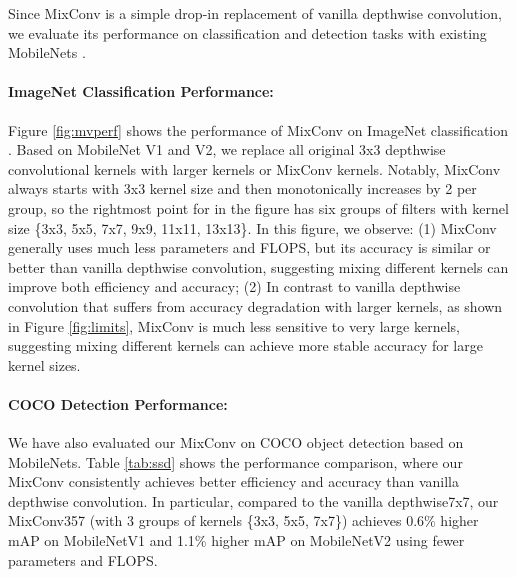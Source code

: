 \documentclass{sty/bmvc2k}
\begin{document}
Since MixConv is a simple drop-in replacement of vanilla depthwise convolution, we evaluate its performance on classification and detection tasks  with existing MobileNets \cite{mobilenetv117,mobilenetv218}.


\paragraph{ImageNet Classification Performance:} 
Figure  \ref{fig:mvperf} shows the performance of MixConv on ImageNet classification \cite{imagenet15}. Based on MobileNet V1 and V2, we replace all original 3x3  depthwise convolutional kernels with larger kernels or MixConv kernels. Notably, MixConv always starts with 3x3 kernel size and then monotonically increases by 2 per group, so the rightmost point for  in the figure has six groups of filters with kernel size \{3x3, 5x5, 7x7, 9x9, 11x11, 13x13\}. In this figure, we observe: (1) MixConv generally uses much less parameters and FLOPS, but its accuracy is similar or better than vanilla depthwise convolution, suggesting mixing different kernels can improve both efficiency and accuracy;  (2) In contrast to vanilla depthwise convolution that suffers from accuracy degradation with larger kernels, as shown in Figure \ref{fig:limits}, MixConv is much less sensitive to very large kernels, suggesting mixing different kernels can achieve more stable accuracy for large kernel sizes. 


\paragraph{COCO Detection Performance:} We have also evaluated our MixConv on COCO object detection based on MobileNets. Table \ref{tab:ssd} shows the performance comparison, where our MixConv consistently achieves better efficiency and accuracy than vanilla depthwise convolution.  In particular, compared to the vanilla depthwise7x7, our MixConv357 (with 3 groups of kernels \{3x3, 5x5, 7x7\}) achieves 0.6\% higher mAP on MobileNetV1 and 1.1\% higher mAP  on MobileNetV2 using fewer parameters and FLOPS.
\end{document}
